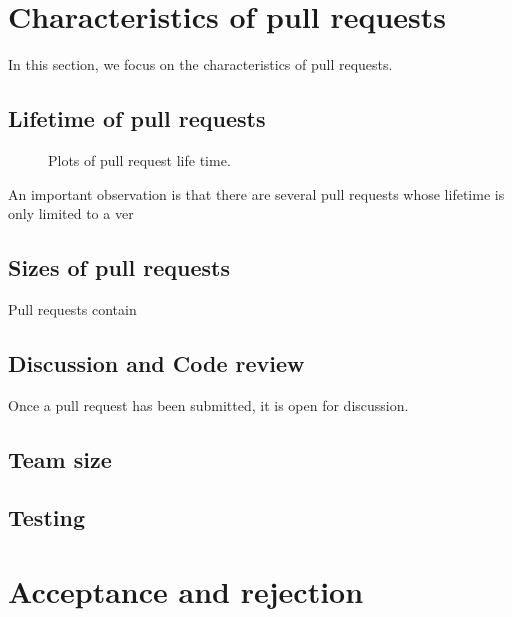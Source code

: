 \documentclass{sig-alternate}
\begin{document}
\section{Characteristics of pull requests}
In this section, we focus on the characteristics of pull requests. 

\subsection{Lifetime of pull requests}

\begin{figure*}
\centering
{}
\caption{Plots of pull request life time.}
\end{figure*}


An important observation is that there are several pull requests whose
lifetime is only limited to a ver

\subsection{Sizes of pull requests}

Pull requests contain 

\subsection{Discussion and Code review}

Once a pull request has been submitted, it is open for discussion. 

\subsection{Team size}

\subsection{Testing}

\section{Acceptance and rejection}
\label{sec:accrej}
\end{document}
